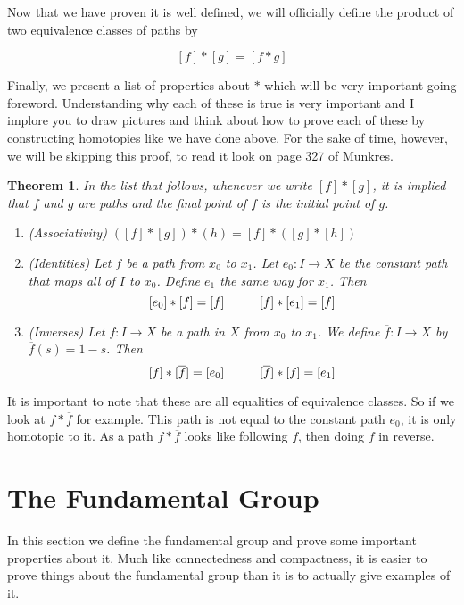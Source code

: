\documentclass[a4paper]{article}
\newtheorem{theorem}{Theorem}
\numberwithin{theorem}{section}
\begin{document}
Now that we have proven it is well defined, we will officially define the product of two equivalence classes of paths by

$$ [f] \ast [g] = [f \ast g] $$

Finally, we present a list of properties about $\ast$ which will be very important going foreword. Understanding why each of these is true is very important and I implore you to draw pictures and think about how to prove each of these by constructing homotopies like we have done above. For the sake of time, however, we will be skipping this proof, to read it look on page 327 of Munkres.

\begin{theorem}
In the list that follows, whenever we write $[f] \ast [g]$, it is implied that $f$ and $g$ are paths and the final point of $f$ is the initial point of $g$.

\begin{enumerate}
    \item (Associativity) $([f] \ast [g]) \ast (h) = [f] \ast ([g] \ast [h])$
    \item (Identities) Let $f$ be a path from $x_0$ to $x_1$. Let $e_0: I \rightarrow X$ be the constant path that maps all of $I$ to $x_0$. Define $e_1$ the same way for $x_1$. Then
    $$ [e_0] \ast [f] = [f] \text{\hspace{1cm}}  [f] \ast [e_1] = [f] $$
    \item (Inverses) Let $f: I \rightarrow X$ be a path in $X$ from $x_0$ to $x_1$. We define $\overline{f}: I \rightarrow X$ by $\overline{f}(s) = 1-s$. Then
    $$ [f] \ast [\overline{f}] =  [e_0] \text{\hspace{1cm}}  [\overline{f}] \ast [f] = [e_1] $$
\end{enumerate}
\end{theorem}

It is important to note that these are all equalities of equivalence classes. So if we look at $f \ast \overline{f}$ for example. This path is not equal to the constant path $e_0$, it is only homotopic to it. As a path $f \ast \overline{f}$ looks like following $f$, then doing $f$ in reverse.


\section{The Fundamental Group}
In this section we define the fundamental group and prove some important properties about it. Much like connectedness and compactness, it is easier to prove things about the fundamental group than it is to actually give examples of it.
\end{document}
